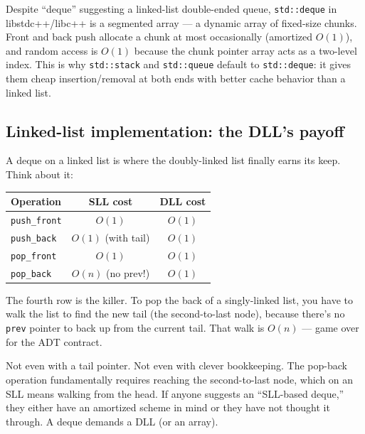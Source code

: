 \documentclass[11pt]{article}
\begin{document}
\begin{notebox}
Despite ``deque'' suggesting a linked-list double-ended queue,
\texttt{std::deque} in libstdc++/libc++ is a segmented array
--- a dynamic array of fixed-size chunks. Front and back push
allocate a chunk at most occasionally (amortized $O(1)$), and
random access is $O(1)$ because the chunk pointer array acts as
a two-level index. This is why \texttt{std::stack} and
\texttt{std::queue} default to \texttt{std::deque}: it gives them
cheap insertion/removal at both ends with better cache behavior
than a linked list.
\end{notebox}

\subsection*{Linked-list implementation: the DLL's payoff}

A deque on a linked list is where the doubly-linked list finally
earns its keep. Think about it:

\begin{center}
\begin{tabular}{|l|c|c|}
\hline
\textbf{Operation} & \textbf{SLL cost} & \textbf{DLL cost} \\
\hline
\texttt{push\_front}  & $O(1)$ & $O(1)$ \\
\texttt{push\_back}   & $O(1)$ (with tail) & $O(1)$ \\
\texttt{pop\_front}   & $O(1)$ & $O(1)$ \\
\texttt{pop\_back}    & $O(n)$ (no prev!)  & $O(1)$ \\
\hline
\end{tabular}
\end{center}

The fourth row is the killer. To pop the back of a singly-linked
list, you have to walk the list to find the new tail (the
second-to-last node), because there's no \texttt{prev} pointer to
back up from the current tail. That walk is $O(n)$ --- game over
for the ADT contract.

\begin{warnbox}
Not even with a tail pointer. Not even with clever bookkeeping.
The pop-back operation fundamentally requires reaching the
second-to-last node, which on an SLL means walking from the head.
If anyone suggests an ``SLL-based deque,'' they either have an
amortized scheme in mind or they have not thought it through. A
deque demands a DLL (or an array).
\end{warnbox}
\end{document}
